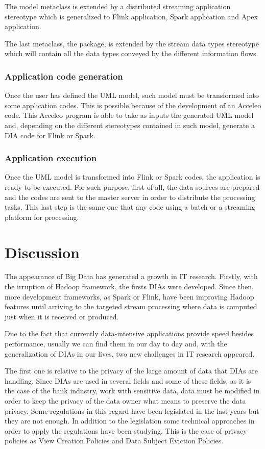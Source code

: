 The model metaclass is extended by a distributed streaming application stereotype which is generalized to Flink application, Spark application and Apex application.

The last metaclass, the package, is extended by the stream data types stereotype which will contain all the data types conveyed by the different information flows.

\subsubsection*{Application code generation}

Once the user has defined the UML model, such model must be transformed into some application codes. This is possible because of the development of an Acceleo code. This Acceleo program is able to take as inputs the generated UML model and, depending on the different stereotypes contained in such model, generate a DIA code for Flink or Spark.

\subsubsection*{Application execution}

Once the UML model is transformed into Flink or Spark codes, the application is ready to be executed. For such purpose, first of all, the data sources are prepared and the codes are sent to the master server in order to distribute the processing tasks. This last step is the same one that any code using a batch or a streaming platform for processing.

\section{Discussion}

The appearance of Big Data has generated a growth in IT research. Firstly, with the irruption of Hadoop framework, the firsts DIAs were developed. Since then, more development frameworks, as Spark or Flink, have been improving Hadoop features until arriving to the targeted stream processing where data is computed just when it is received or produced.

Due to the fact that currently data-intensive applications provide speed besides performance, usually we can find them in our day to day and, with the generalization of DIAs in our lives, two new challenges in IT research appeared.

The first one is relative to the privacy of the large amount of data that DIAs are handling. Since DIAs are used in several fields and some of these fields, as it is the case of the bank industry, work with sensitive data, data must be modified in order to keep the privacy of the data owner what means to preserve the data privacy. Some regulations in this regard have been legislated in the last years but they are not enough. In addition to the legislation some technical approaches in order to apply the regulations have been studying. This is the case of privacy policies as View Creation Policies and Data Subject Eviction Policies.

